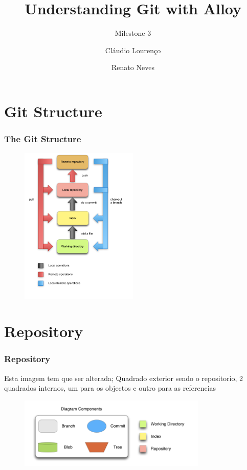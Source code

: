 \documentclass{beamer}
\title{Understanding Git with Alloy}
\subtitle{Milestone 3}
\author{Cláudio Lourenço \and Renato Neves}
\institute{University of Minho\\
Formal Methods in Software Engineering}
\begin{document}
\frame {
   \titlepage
}


\section{Git Structure}
\begin{frame}
   \frametitle{The Git Structure}
   \begin{figure}
      \centering
      \includegraphics[width=0.5\textwidth]{images/git_workflow.png}
   \end{figure}
\end{frame}

\section{Repository}
\begin{frame}
   \frametitle{Repository}
   Esta imagem tem que ser alterada; Quadrado exterior sendo o
   repositorio, 2 quadrados internos, um para os objectos e outro para
   as referencias
   \begin{figure}
      \centering
      \includegraphics[width=0.8\textwidth]{images/Legenda.png}
   \end{figure}
\end{frame}
\end{document}
